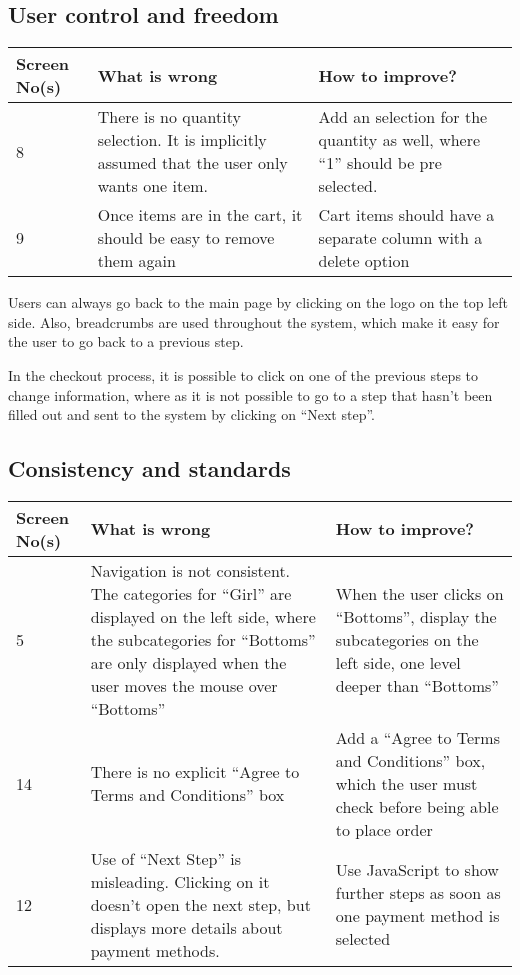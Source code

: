\documentclass[fontsize=12pt,paper=a4]{scrartcl}
\begin{document}
\subsection{User control and freedom}
\begin{table}[htdp]
\begin{center}
\begin{tabular}{|p{2cm}|p{6.5cm}|p{6.5cm}|}
\hline
\textbf{Screen No(s)} & \textbf{What is wrong} & \textbf{How to improve?} \\
\hline
8 & There is no quantity selection. It is implicitly assumed that the user only wants one item. & Add an selection for the quantity as well, where ``1'' should be pre selected. \\
\hline
9 & Once items are in the cart, it should be easy to remove them again & Cart items should have a separate column with a delete option\\
\hline
\end{tabular}
\end{center}
\label{3_heurisitcs_eval}
\end{table}

Users can always go back to the main page by clicking on the logo on the top left side. Also, breadcrumbs are used throughout the system, which make it easy for the user to go back to a previous step. 

In the checkout process, it is possible to click on one of the previous steps to change information, where as it is not possible to go to a step that hasn't been filled out and sent to the system by clicking on ``Next step''.

\subsection{Consistency and standards}
\begin{table}[htdp]
\begin{center}
\begin{tabular}{|p{2cm}|p{6.5cm}|p{6.5cm}|}
\hline
\textbf{Screen No(s)} & \textbf{What is wrong} & \textbf{How to improve?} \\
\hline
5 & Navigation is not consistent. The categories for ``Girl'' are displayed on the left side, where the subcategories for ``Bottoms'' are only displayed when the user moves the mouse over ``Bottoms'' & When the user clicks on ``Bottoms'', display the subcategories on the left side, one level deeper than ``Bottoms'' \\ 
\hline
14 & There is no explicit ``Agree to Terms and Conditions'' box & Add a ``Agree to Terms and Conditions'' box, which the user must check before being able to place order\\
\hline
12 & Use of ``Next Step'' is misleading. Clicking on it doesn't open the next step, but displays more details about payment methods. & Use JavaScript to show further steps as soon as one payment method is selected \\
\hline
\end{tabular}
\end{center}
\label{4_heurisitcs_eval}
\end{table}
\end{document}
